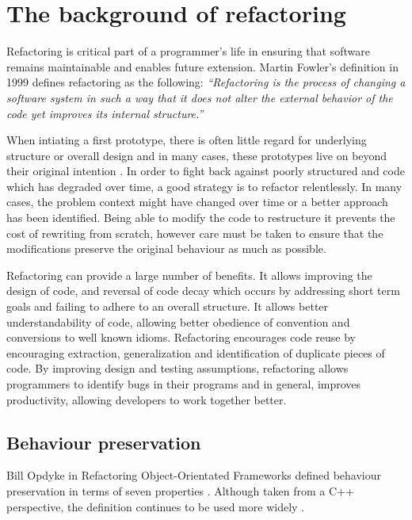 \section{The background of refactoring}\label{S:refactorback}
Refactoring is critical part of a programmer's life in ensuring that software remains maintainable and enables future extension. Martin Fowler's definition in 1999 \cite{fowler99} defines refactoring as the following: \emph{``Refactoring is the process of changing a software system in such a way that it does not alter the external behavior of the code yet improves its internal structure.''}

When intiating a first prototype, there is often little regard for underlying structure or overall design and in many cases, these prototypes live on beyond their original intention \cite{foote1997big}. In order to fight back against poorly structured and code which has degraded over time, a good strategy is to refactor relentlessly. In many cases, the problem context might have changed over time or a better approach has been identified. Being able to modify the code to restructure it prevents the cost of rewriting from scratch, however care must be taken to ensure that the modifications preserve the original behaviour as much as possible.

Refactoring can provide a large number of benefits. It allows improving the design of code, and reversal of code decay which occurs by addressing short term goals and failing to adhere to an overall structure. It allows better understandability of code, allowing better obedience of convention and conversions to well known idioms. Refactoring encourages code reuse by encouraging extraction, generalization and identification of duplicate pieces of code. By improving design and testing assumptions, refactoring allows programmers to identify bugs in their programs and in general, improves productivity, allowing developers to work together better.

\subsection{Behaviour preservation}
Bill Opdyke in Refactoring Object-Orientated Frameworks defined behaviour preservation in terms of seven properties \cite{opdyke1992refactoring}. Although taken from a C++ perspective, the definition continues to be used more widely \cite{schafer2010specification}.


